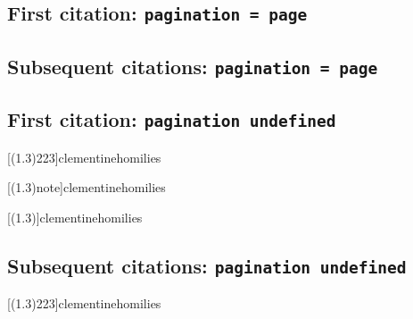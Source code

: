 \documentclass[a4paper]{article}
\begin{document}
\AtNextCite{\renewcommand*{\volcitedelim}{\addcomma\space}}
\cite[note]{augustine:letters}

\subsection{First citation: \texttt{pagination = page}}

\cite{augustine:letters:a}

\citereset
\cite[10]{augustine:letters:a}

\citereset
\cite[note]{augustine:letters:a}

\subsection{Subsequent citations: \texttt{pagination = page}}

\cite{augustine:letters:a}

\cite[10]{augustine:letters:a}

\cite[note]{augustine:letters:a}

\subsection{First citation: \texttt{pagination undefined}}

\cite[(1.3)]{clementinehomilies}

\citereset
\cite[(1.3)8:223]{clementinehomilies}

\citereset
\cite[(1.3)223]{clementinehomilies}

\citereset
{}[(1.3)223]{clementinehomilies}

\citereset
\AtNextCite{\renewcommand*{\volcitedelim}{\addcomma\space}}
[(1.3)note]{clementinehomilies}

\citereset
{}[(1.3)]{clementinehomilies}

\citereset
\cite[(1.3)note]{clementinehomilies}

\subsection{Subsequent citations: \texttt{pagination undefined}}

\cite[(1.3)]{clementinehomilies}

\cite[(1.3)8:223]{clementinehomilies}

\cite[(1.3)223]{clementinehomilies}

[(1.3)223]{clementinehomilies}
\end{document}
